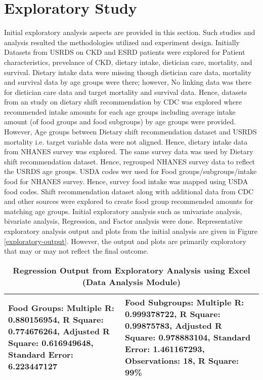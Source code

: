 \section{Exploratory Study}
Initial exploratory analysis aspects are provided in this section. Such studies and analysis resulted the methodologies utilized and experiment design. Initially Datasets from USRDS on CKD and ESRD patients were explored for Patient characteristics, prevelance of CKD, dietary intake, dietician care, mortality, and survival. Dietary intake data were missing though dietician care data, mortality and survival data by age groups were there; however, No linking data was there for dietician care data and target mortality and survival data. Hence, datasets from an study on dietary shift recommendation by CDC was explored where recommended intake amounts for each age groups including average intake amount (of food groups and food subgroups) by age groups  were provided.  However, Age groups between Dietary shift recommendation dataset and USRDS mortality i.e. target variable data were not aligned. Hence, dietary intake data from NHANES survey was explored. The same survey data was used by Dietary shift recommendation dataset. Hence, regrouped NHANES survey data to reflect the USRDS age groups. USDA codes wer used for Food groups/subgroups/intake food for NHANES survey. Hence, survey food intake was mapped using USDA food codes. Shift recommendation dataset along with additional data from CDC and other sources were explored to create food group recommended amounts for matching age groups. Initial exploratory analysis such as univariate analysis, bivariate analysis, Regression, and Factor analysis were done.  Representative exploratory analysis output and plots from the initial analysis are given in Figure \ref{exploratory-output}. However, the output and plots are primarily exploratory that may or may not reflect the final outcome. 

\begin{table}
\caption{\textbf{Regression Output from Exploratory Analysis using Excel (Data Analysis Module)}}
\begin{tabular}{  | p{7.5 cm} | p{7.5cm} | }
\hline
\textbf{Food Groups:}
Multiple R:	0.880156954, R Square:	0.774676264, Adjusted R Square: 	0.616949648, Standard Error:	6.223447127
&
\textbf{Food Subgroups:}
Multiple R:		0.999378722, R Square:		0.99875783,  Adjusted R Square:	 0.978883104, Standard Error:	1.461167293, Observations:		18, R Square: 99\% \\
\hline
\end{tabular}
\end{table}


